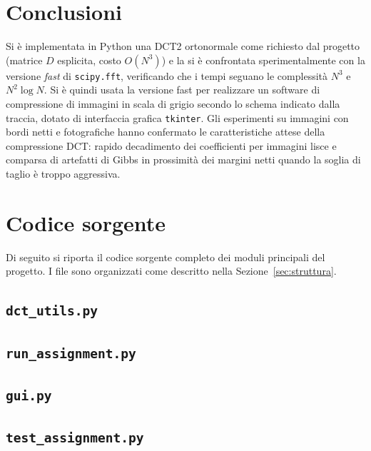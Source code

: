 \documentclass[11pt,a4paper]{article}
\begin{document}
\section{Conclusioni}\label{sec:conclusioni}

Si è implementata in Python una DCT2 ortonormale come richiesto dal progetto
(matrice $D$ esplicita, costo $O(N^3)$) e la si è confrontata sperimentalmente
con la versione \emph{fast} di \texttt{scipy.fft}, verificando che i tempi
seguano le complessità $N^3$ e $N^2\log N$. Si è quindi usata la versione fast
per realizzare un software di compressione di immagini in scala di grigio
secondo lo schema indicato dalla traccia, dotato di interfaccia grafica
\texttt{tkinter}. Gli esperimenti su immagini con bordi netti e fotografiche
hanno confermato le caratteristiche attese della compressione DCT: rapido
decadimento dei coefficienti per immagini lisce e comparsa di artefatti di
Gibbs in prossimità dei margini netti quando la soglia di taglio è troppo
aggressiva.

\appendix
\section{Codice sorgente}\label{app:codice}

Di seguito si riporta il codice sorgente completo dei moduli principali del
progetto. I file sono organizzati come descritto nella
Sezione~\ref{sec:struttura}.

\subsection{\texttt{dct\_utils.py}}


\subsection{\texttt{run\_assignment.py}}


\subsection{\texttt{gui.py}}


\subsection{\texttt{test\_assignment.py}}

\end{document}
